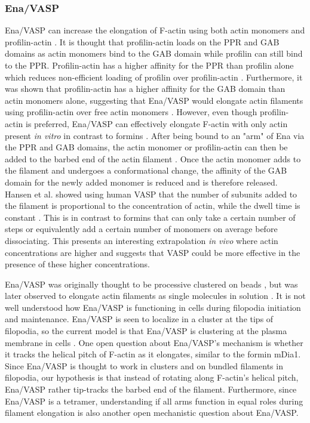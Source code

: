 \subsubsection{Ena/VASP}
Ena/VASP can increase the elongation of F-actin using both actin monomers and profilin-actin \citep{kang_profilin_1997,hansen_vasp_2010, winkelman_ena/vasp_2014}. It is thought that profilin-actin loads on the PPR and GAB domains as actin monomers bind to the GAB domain while profilin can still bind to the PPR. Profilin-actin has a higher affinity for the PPR than profilin alone which reduces non-efficient loading of profilin over profilin-actin \citep{ferron_structural_2007}. Furthermore, it was shown that profilin-actin has a higher affinity for the GAB domain than actin monomers alone, suggesting that Ena/VASP would elongate actin filaments using profilin-actin over free actin monomers \citep{chereau_understanding_2006}. However, even though profilin-actin is preferred, Ena/VASP can effectively elongate F-actin with only actin present \textit{in vitro} in contrast to formins \citep{hansen_vasp_2010,winkelman_ena/vasp_2014}. After being bound to an "arm" of Ena via the PPR and GAB domains, the actin monomer or profilin-actin can then be added to the barbed end of the actin filament \citep{chereau_understanding_2006, ferron_structural_2007, breitsprecher_molecular_2011}. Once the actin monomer adds to the filament and undergoes a conformational change, the affinity of the GAB domain for the newly added monomer is reduced and is therefore released. Hansen et al. showed using human VASP that the number of subunits added to the filament is proportional to the concentration of actin, while the dwell time is constant \citep{hansen_vasp_2010}. This is in contrast to formins that can only take a certain number of steps or equivalently add a certain number of monomers on average before dissociating. This presents an interesting extrapolation \textit{in vivo} where actin concentrations are higher and suggests that VASP could be more effective in the presence of these higher concentrations.  

Ena/VASP was originally thought to be processive clustered on beads \citep{breitsprecher_clustering_2008}, but was later observed to elongate actin filaments as single molecules in solution \citep{hansen_vasp_2010,winkelman_ena/vasp_2014, breitsprecher_molecular_2011}. It is not well understood how Ena/VASP is functioning in cells during filopodia initiation and maintenance. Ena/VASP is seen to localize in a cluster at the tips of filopodia, so the current model is that Ena/VASP is clustering at the plasma membrane in cells \citep{svitkina_mechanism_2003,lanier_mena_1999}. One open question about Ena/VASP's mechanism is whether it tracks the helical pitch of F-actin as it elongates, similar to the formin mDia1. Since Ena/VASP is thought to work in clusters and on bundled filaments in filopodia, our hypothesis is that instead of rotating along F-actin's helical pitch, Ena/VASP rather tip-tracks the barbed end of the filament. Furthermore, since Ena/VASP is a tetramer, understanding if all arms function in equal roles during filament elongation is also another open mechanistic question about Ena/VASP. 

